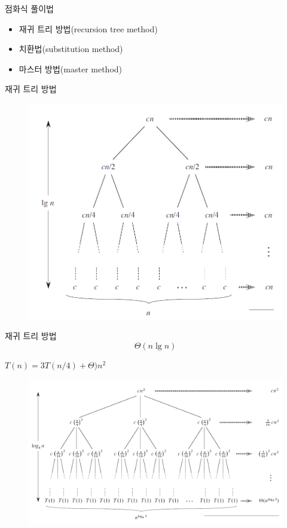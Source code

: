 \documentclass[10pt]{beamer}
\begin{document}
\begin{frame}{점화식 풀이법}
    \begin{itemize}
        \item 재귀 트리 방법(recursion tree method) \pause
        \item 치환법(substitution method) \pause
        \item 마스터 방법(master method)
    \end{itemize}
\end{frame}



\begin{frame}{재귀 트리 방법}
    \begin{figure}[h!]
        \includegraphics[scale=0.4]{mergetree.png}
    \end{figure}
\end{frame}    




\begin{frame}{재귀 트리 방법}
    $$\Theta(n \lg n)$$
\end{frame}


\begin{frame}{ex}
    $T(n) = 3T(n/4) + \Theta)n^2$
    
    \begin{figure}[h!]
        \includegraphics[scale=0.3]{tree.png}
    \end{figure}
\end{frame}
\end{document}
